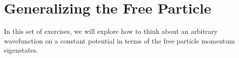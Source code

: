 %
%
%
%

\section*{Generalizing the Free Particle}

	In this set of exercises, we will explore how to think about an arbitrary wavefunction on a constant potential in terms of the free particle momentum eigenstates.


